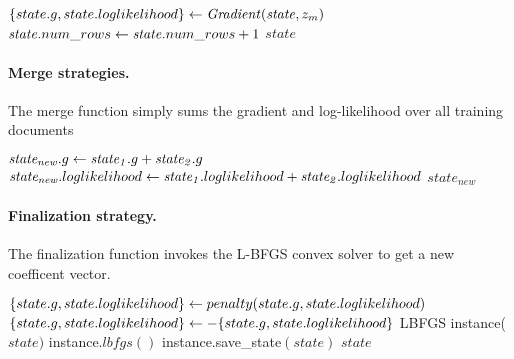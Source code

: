 \begin{algorithm} \label{alg:transition-lbfgs}
\begin{algorithmic}[1]
    \State $\{state.g,state.loglikelihood\}  \leftarrow \mathit{Gradient}(\mathit{state}, z_m)$
    \State $\mathit{state}.num\_rows \leftarrow \mathit{state}.num\_rows + 1$
    \State \Return $\mathit{state}$
\end{algorithmic}
\end{algorithm}


\paragraph{Merge strategies.}
The merge function simply sums the gradient and log-likelihood over all training documents 
\begin{algorithm} \label{alg:merge-lbfgs}
\begin{algorithmic}[1]
    \State $\mathit{state_{new}}.g \leftarrow \mathit{state_1}.g + \mathit{state_2}.g$
    \State $\mathit{state_{new}}.loglikelihood \leftarrow \mathit{state_1}.loglikelihood + \mathit{state_2}.loglikelihood$
    \State \Return $\mathit{state_{new}}$
\end{algorithmic}
\end{algorithm}


\paragraph{Finalization strategy.}
The finalization function invokes the L-BFGS convex solver to get a new coefficent vector.\\

\begin{algorithm} \label{alg:CRF training}
\begin{algorithmic}[1]
        \State $\{state.g,state.loglikelihood\} \leftarrow penalty(state.g,state.loglikelihood)$  
        \State $\{state.g,state.loglikelihood\}\leftarrow-\{state.g,state.loglikelihood\}$ 
        \State LBFGS instance($state)$ 
        \State instance.$lbfgs()$ 
        \State instance.save\_state$(state)$ 
        \State \Return $state$
\end{algorithmic}
\end{algorithm}

